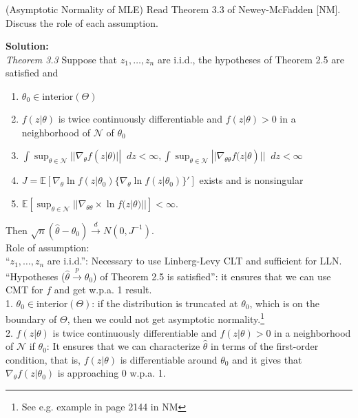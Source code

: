 \documentclass[11pt,letterpaper]{article}                  %
\newcommand*\diff{\mathop{}\!d} %
\begin{document}
\bigskip
\begin{problem} (Asymptotic Normality of MLE) Read Theorem 3.3 of Newey-McFadden [NM]. Discuss the role of each assumption.

\textbf{Solution:} \\

\textit{Theorem 3.3} Suppose that $z_1, \dots, z_n$ are i.i.d., the hypotheses of Theorem 2.5 are satisfied and 
\begin{enumerate}
	\item $\theta_0 \in \text{interior}(\Theta)$
	
	\item $f(z|\theta)$ is twice continuously differentiable and $f(z|\theta) > 0$ in a neighborhood of $\mathcal{N}$ of $\theta_0$
	
	\item $\int \sup_{\theta \in \mathcal{N}} || \nabla_\theta f(z|\theta) || \diff z < \infty, \int \sup_{\theta \in \mathcal{N}} || \nabla_{\theta \theta} f(z|\theta) || \diff z < \infty$
	
	\item $J = \mathbb{E} [\nabla_\theta \ln f(z|\theta_0) \{\nabla_\theta \ln f(z|\theta_0)  \}' ]$ exists and is nonsingular
	
	\item  $ \mathbb{E} [ \sup_{\theta \in \mathcal{N}} || \nabla_{\theta \theta}  \times \ln f(z|\theta)||] < \infty$.
\end{enumerate}
Then $\sqrt{n}(\hat{\theta} - \theta_0) \xrightarrow{d} N(0, J^{-1}).$ \\
 
Role of assumption: \\

``$z_1, \dots, z_n$ are i.i.d.'': Necessary to use Linberg-Levy CLT and sufficient for LLN. \\

``Hypotheses ($\hat{\theta} \xrightarrow{p}  \theta_0$) of Theorem 2.5 is satisfied'':  it ensures that we can use CMT for $f$ and get w.p.a. 1 result. \\

1.  $\theta_0 \in \text{interior}(\Theta)$: if the distribution is truncated at $\theta_0$, which is on the boundary of $\Theta$, then we could not get asymptotic normality.\footnote{See e.g. example in page 2144 in NM} \\

2. $f(z|\theta)$ is twice continuously differentiable and $f(z|\theta) > 0$ in a neighborhood of $\mathcal{N}$ if $\theta_0$: It ensures that we can characterize $\hat{\theta}$ in terms of the first-order condition, that is, $f(z|\theta)$ is differentiable around $\theta_0$ and it gives that $\nabla_\theta f(z|\theta_0)$ is approaching 0 w.p.a. 1. \\


\end{problem}
\end{document}
